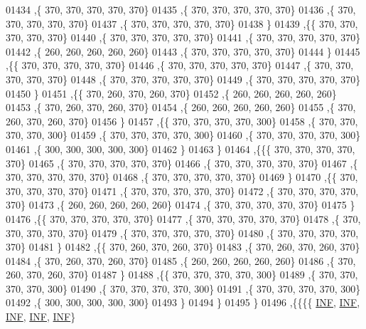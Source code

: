 \begin{DoxyCode}
01434    ,\{   370,   370,   370,   370,   370\}
01435    ,\{   370,   370,   370,   370,   370\}
01436    ,\{   370,   370,   370,   370,   370\}
01437    ,\{   370,   370,   370,   370,   370\}
01438    \}
01439   ,\{\{   370,   370,   370,   370,   370\}
01440    ,\{   370,   370,   370,   370,   370\}
01441    ,\{   370,   370,   370,   370,   370\}
01442    ,\{   260,   260,   260,   260,   260\}
01443    ,\{   370,   370,   370,   370,   370\}
01444    \}
01445   ,\{\{   370,   370,   370,   370,   370\}
01446    ,\{   370,   370,   370,   370,   370\}
01447    ,\{   370,   370,   370,   370,   370\}
01448    ,\{   370,   370,   370,   370,   370\}
01449    ,\{   370,   370,   370,   370,   370\}
01450    \}
01451   ,\{\{   370,   260,   370,   260,   370\}
01452    ,\{   260,   260,   260,   260,   260\}
01453    ,\{   370,   260,   370,   260,   370\}
01454    ,\{   260,   260,   260,   260,   260\}
01455    ,\{   370,   260,   370,   260,   370\}
01456    \}
01457   ,\{\{   370,   370,   370,   370,   300\}
01458    ,\{   370,   370,   370,   370,   300\}
01459    ,\{   370,   370,   370,   370,   300\}
01460    ,\{   370,   370,   370,   370,   300\}
01461    ,\{   300,   300,   300,   300,   300\}
01462    \}
01463   \}
01464  ,\{\{\{   370,   370,   370,   370,   370\}
01465    ,\{   370,   370,   370,   370,   370\}
01466    ,\{   370,   370,   370,   370,   370\}
01467    ,\{   370,   370,   370,   370,   370\}
01468    ,\{   370,   370,   370,   370,   370\}
01469    \}
01470   ,\{\{   370,   370,   370,   370,   370\}
01471    ,\{   370,   370,   370,   370,   370\}
01472    ,\{   370,   370,   370,   370,   370\}
01473    ,\{   260,   260,   260,   260,   260\}
01474    ,\{   370,   370,   370,   370,   370\}
01475    \}
01476   ,\{\{   370,   370,   370,   370,   370\}
01477    ,\{   370,   370,   370,   370,   370\}
01478    ,\{   370,   370,   370,   370,   370\}
01479    ,\{   370,   370,   370,   370,   370\}
01480    ,\{   370,   370,   370,   370,   370\}
01481    \}
01482   ,\{\{   370,   260,   370,   260,   370\}
01483    ,\{   370,   260,   370,   260,   370\}
01484    ,\{   370,   260,   370,   260,   370\}
01485    ,\{   260,   260,   260,   260,   260\}
01486    ,\{   370,   260,   370,   260,   370\}
01487    \}
01488   ,\{\{   370,   370,   370,   370,   300\}
01489    ,\{   370,   370,   370,   370,   300\}
01490    ,\{   370,   370,   370,   370,   300\}
01491    ,\{   370,   370,   370,   370,   300\}
01492    ,\{   300,   300,   300,   300,   300\}
01493    \}
01494   \}
01495  \}
01496 ,\{\{\{\{   \mbox{\hyperlink{1_88_84__epars_8h_a12c2040f25d8e3a7b9e1c2024c618cb6}{INF}},   \mbox{\hyperlink{1_88_84__epars_8h_a12c2040f25d8e3a7b9e1c2024c618cb6}{INF}},   \mbox{\hyperlink{1_88_84__epars_8h_a12c2040f25d8e3a7b9e1c2024c618cb6}{INF}},   \mbox{\hyperlink{1_88_84__epars_8h_a12c2040f25d8e3a7b9e1c2024c618cb6}{INF}},   \mbox{\hyperlink{1_88_84__epars_8h_a12c2040f25d8e3a7b9e1c2024c618cb6}{INF}}\}

\end{DoxyCode}
